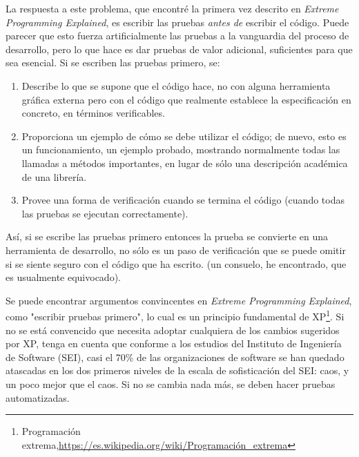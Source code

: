 
La respuesta a este problema, que encontré la primera vez descrito en \textit{Extreme Programming Explained}, es escribir las pruebas \textit{antes de} escribir el código. Puede parecer que esto fuerza artificialmente las pruebas a la vanguardia del proceso de desarrollo, pero lo que hace es dar pruebas de valor adicional, suficientes para que sea esencial. Si se escriben las pruebas primero, se:    \newline

\begin{enumerate}[1.]

    \item Describe lo que se supone que el código hace, no con alguna herramienta gráfica externa pero con el código que realmente establece la especificación en concreto, en términos verificables.
    
    \item Proporciona un ejemplo de cómo se debe utilizar el código; de nuevo, esto es un funcionamiento, un ejemplo probado, mostrando normalmente todas las llamadas a métodos importantes, en lugar de sólo una descripción académica de una librería.
    
    \item Provee una forma de verificación cuando se termina el código (cuando todas las pruebas se ejecutan correctamente).
    
\end{enumerate}

Así, si se escribe las pruebas primero entonces la prueba se convierte en una herramienta de desarrollo, no sólo es un paso de verificación que se puede omitir si se siente seguro con el código que ha escrito. (un consuelo, he encontrado, que es usualmente equivocado).    \newline

Se puede encontrar argumentos convincentes en \textit{Extreme Programming Explained}, como "escribir pruebas primero", lo cual es un principio fundamental de XP\footnote{Programación extrema,\url{https://es.wikipedia.org/wiki/Programación_extrema}}.
Si  no se está convencido que necesita adoptar cualquiera de los cambios sugeridos por XP, tenga en cuenta que conforme a los estudios del Instituto de Ingeniería de Software (SEI), 
casi el 70\% de las organizaciones de software se han quedado atascadas en los dos primeros niveles de la escala de sofisticación del SEI: caos, y un poco mejor que el caos. Si no se cambia nada más, se deben hacer pruebas automatizadas.

